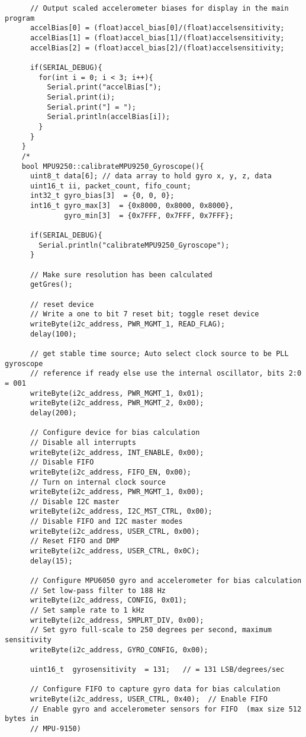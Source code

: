 \begin{lstlisting}
	  // Output scaled accelerometer biases for display in the main program
	  accelBias[0] = (float)accel_bias[0]/(float)accelsensitivity;
	  accelBias[1] = (float)accel_bias[1]/(float)accelsensitivity;
	  accelBias[2] = (float)accel_bias[2]/(float)accelsensitivity;

	  if(SERIAL_DEBUG){
	    for(int i = 0; i < 3; i++){
	      Serial.print("accelBias[");
	      Serial.print(i);
	      Serial.print("] = ");
	      Serial.println(accelBias[i]);
	    }
	  }
	}
	/*
	bool MPU9250::calibrateMPU9250_Gyroscope(){
	  uint8_t data[6]; // data array to hold gyro x, y, z, data
	  uint16_t ii, packet_count, fifo_count;
	  int32_t gyro_bias[3]  = {0, 0, 0};
	  int16_t gyro_max[3]  = {0x8000, 0x8000, 0x8000},
	          gyro_min[3]  = {0x7FFF, 0x7FFF, 0x7FFF};

	  if(SERIAL_DEBUG){
	    Serial.println("calibrateMPU9250_Gyroscope");
	  }

	  // Make sure resolution has been calculated
	  getGres();

	  // reset device
	  // Write a one to bit 7 reset bit; toggle reset device
	  writeByte(i2c_address, PWR_MGMT_1, READ_FLAG);
	  delay(100);

	  // get stable time source; Auto select clock source to be PLL gyroscope
	  // reference if ready else use the internal oscillator, bits 2:0 = 001
	  writeByte(i2c_address, PWR_MGMT_1, 0x01);
	  writeByte(i2c_address, PWR_MGMT_2, 0x00);
	  delay(200);

	  // Configure device for bias calculation
	  // Disable all interrupts
	  writeByte(i2c_address, INT_ENABLE, 0x00);
	  // Disable FIFO
	  writeByte(i2c_address, FIFO_EN, 0x00);
	  // Turn on internal clock source
	  writeByte(i2c_address, PWR_MGMT_1, 0x00);
	  // Disable I2C master
	  writeByte(i2c_address, I2C_MST_CTRL, 0x00);
	  // Disable FIFO and I2C master modes
	  writeByte(i2c_address, USER_CTRL, 0x00);
	  // Reset FIFO and DMP
	  writeByte(i2c_address, USER_CTRL, 0x0C);
	  delay(15);

	  // Configure MPU6050 gyro and accelerometer for bias calculation
	  // Set low-pass filter to 188 Hz
	  writeByte(i2c_address, CONFIG, 0x01);
	  // Set sample rate to 1 kHz
	  writeByte(i2c_address, SMPLRT_DIV, 0x00);
	  // Set gyro full-scale to 250 degrees per second, maximum sensitivity
	  writeByte(i2c_address, GYRO_CONFIG, 0x00);

	  uint16_t  gyrosensitivity  = 131;   // = 131 LSB/degrees/sec

	  // Configure FIFO to capture gyro data for bias calculation
	  writeByte(i2c_address, USER_CTRL, 0x40);  // Enable FIFO
	  // Enable gyro and accelerometer sensors for FIFO  (max size 512 bytes in
	  // MPU-9150)


\end{lstlisting}
